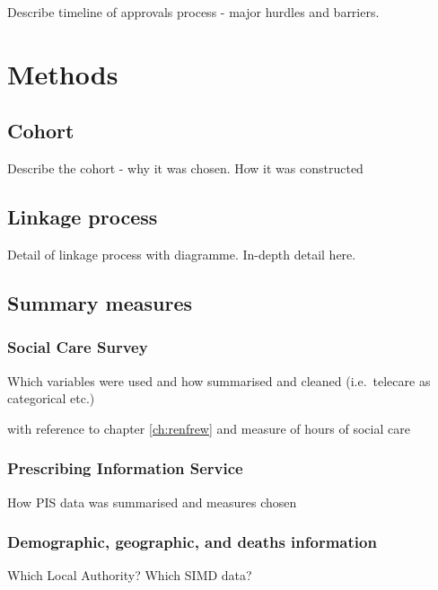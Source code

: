 \documentclass[12pt,]{report}
\begin{document}
Describe timeline of approvals process - major hurdles and barriers.

\FloatBarrier
\newpage
{}

\chapter{Methods}\label{ch:methods}

\section{Cohort}\label{sec:cohort}

Describe the cohort - why it was chosen. How it was constructed

\section{Linkage process}\label{sec:linkage}

Detail of linkage process with diagramme. In-depth detail here.

\section{Summary measures}\label{sec:summaries}

\subsection{Social Care Survey}\label{subsec:scs-summs}

Which variables were used and how summarised and cleaned (i.e.~telecare
as categorical etc.)

with reference to chapter \ref{ch:renfrew} and measure of hours of
social care

\subsection{Prescribing Information Service}\label{subsec:pis-summs}

How PIS data was summarised and measures chosen

\subsection{Demographic, geographic, and deaths information}\label{subsec:nrs-summs}

Which Local Authority? Which SIMD data?
\end{document}
